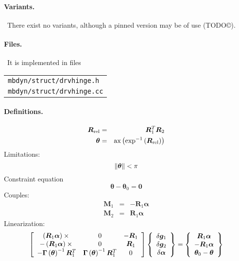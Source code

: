 \documentclass[10pt,dvips,fleqn,subeqn]{report}
\newcommand{\T}[1]{\bm{#1}}
\begin{document}
\paragraph{Variants.} \
There exist no variants, although a pinned version may be of use (TODO\copyright).

\paragraph{Files.} \
It is implemented in files

\begin{tabular}{l}
\texttt{mbdyn/struct/drvhinge.h} \\
\texttt{mbdyn/struct/drvhinge.cc}
\end{tabular}

\paragraph{Definitions.}
\begin{eqnarray*}
	\T{R}_{\text{rel}} & = & \T{R}_1^T \T{R}_2 \\
	\T{\theta} & = & \llk{ax}\plbr{\llk{exp}^{-1}\plbr{\T{R}_{\text{rel}}}}
\end{eqnarray*}
Limitations:
\begin{equation}
	\nrbr{\T{\theta}} < \pi
\end{equation}
Constraint equation 
\begin{equation}
	\T{\theta} - \T{\theta}_0 = \T{0}
\end{equation}
Couples:
\begin{eqnarray*}
	\T{M}_1 & = & -\T{R}_1 \T{\alpha} \\
	\T{M}_2 & = & \T{R}_1 \T{\alpha}
\end{eqnarray*}
Linearization:
\begin{equation}
	\sqbr{\matr{ccc}{
		\plbr{\T{R}_1 \T{\alpha}}\times{} & 0 & -\T{R}_1 \\
		-\plbr{\T{R}_1 \T{\alpha}}\times{} & 0 & \T{R}_1 \\
		-\T{\Gamma}\plbr{\T{\theta}}^{-1} \T{R}_1^T &
			\T{\Gamma}\plbr{\T{\theta}}^{-1} \T{R}_1^T & 0
	}}\cubr{\cvvect{
		\delta\T{g}_1 \\
		\delta\T{g}_2 \\
		\delta\T{\alpha} \\
	}} = \cubr{\cvvect{
		\T{R}_1 \T{\alpha} \\
		-\T{R}_1 \T{\alpha} \\
		\T{\theta}_0 - \T{\theta}
	}}
\end{equation}
\end{document}
